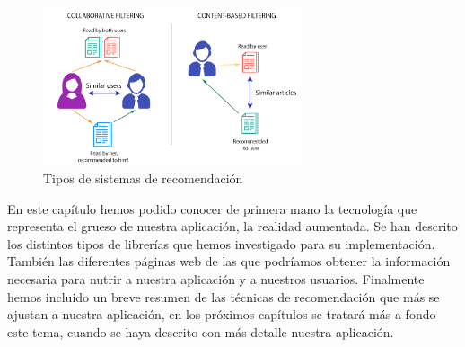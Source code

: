 \begin{figure}[H]
    \centering
    \includegraphics[width=3in, angle=0]{figures/chapter-2/recommendation_systems.png}
    \caption{Tipos de sistemas de recomendación \cite{imagefilters}}
\end{figure}


En este capítulo hemos podido conocer de primera mano la tecnología que representa el grueso de nuestra aplicación, la realidad aumentada. Se han descrito 
los distintos tipos de librerías que hemos investigado para su implementación. También las diferentes páginas web de las que podríamos obtener la información necesaria
para nutrir a nuestra aplicación y a nuestros usuarios. Finalmente hemos incluido un breve resumen de las técnicas de recomendación que más se ajustan a nuestra aplicación, en los próximos capítulos
se tratará más a fondo este tema, cuando se haya descrito con más detalle nuestra aplicación.

